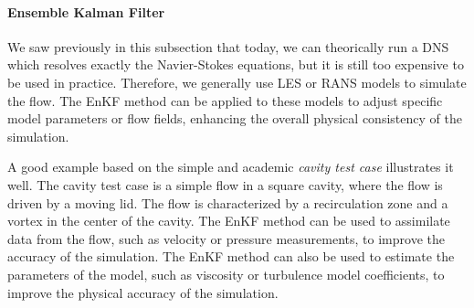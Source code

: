 \paragraph{Ensemble Kalman Filter}

We saw previously in this subsection that today, we can theorically run a \ac{DNS} which resolves exactly the Navier-Stokes equations, but it is still too expensive to be used in practice. Therefore, we generally use \ac{LES} or \ac{RANS} models to simulate the flow. The EnKF method can be applied to these models to adjust specific model parameters or flow fields, enhancing the overall physical consistency of the simulation.

A good example based on the simple and academic \textit{cavity test case} illustrates it well.
The cavity test case is a simple flow in a square cavity, where the flow is driven by a moving lid. The flow is characterized by a recirculation zone and a vortex in the center of the cavity. The EnKF method can be used to assimilate data from the flow, such as velocity or pressure measurements, to improve the accuracy of the simulation. The EnKF method can also be used to estimate the parameters of the model, such as viscosity or turbulence model coefficients, to improve the physical accuracy of the simulation.

